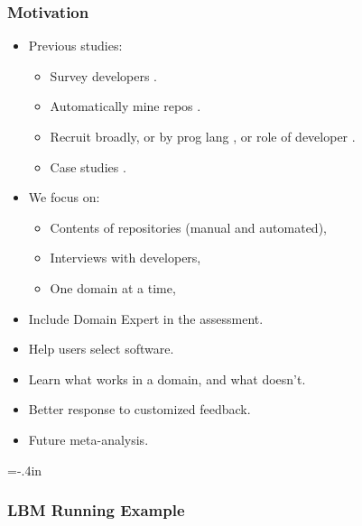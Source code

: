 \documentclass[usenames,dvipsnames]{beamer}
\begin{document}
\begin{frame}

\frametitle{Motivation}

\begin{itemize}
\item Previous studies:
\begin{itemize}
\item Survey developers \citep{HannayEtAl2009, Nguyen-HoanEtAl2010,
PintoEtAl2018}.
\item Automatically mine repos \citep{GrannanEtAl2020, SoodEtAl2019}.
\item Recruit broadly, or by prog lang \citep{PintoEtAl2018}, or role of developer \citep{UditAndKatz2017}.
\item Case studies \citep{CarverEtAl2007,Segal2005}.
\end{itemize}
\item We focus on:
\begin{itemize}
  \item Contents of repositories (manual and automated),
  \item Interviews with developers,
  \item One domain at a time,
\end{itemize}
\item Include Domain Expert in the assessment.
\item Help users select software.
\item Learn what works in a domain, and what doesn't.
\item Better response to customized feedback.
\item Future meta-analysis.
\end{itemize}

\end{frame}


\hoffset=-.4in %
\begin{frame}[plain]

\frametitle{LBM Running Example}

  
\end{frame}
\hoffset=0in %
\end{document}
